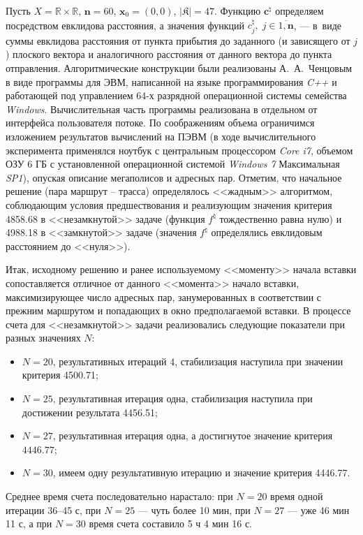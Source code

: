 Пусть
$X=\mathbb{R}\times\mathbb{R}$, $\mathbf{n}=60$,
$\mathbf{x}_0=(0,0)$,
$\vert \mathfrak{K} \vert=47$.
Функцию $\mathbf{c}^{\natural}$
определяем посредством евклидова расстояния,
а значения функций
$c_j^{\natural},\;j \in \overline{1,\mathbf{n}}$, ---
в~виде суммы евклидова расстояния от пункта прибытия до заданного
(и зависящего от $j$)
плоского вектора и аналогичного расстояния от данного
вектора до пункта отправления.
Алгоритмические конструкции были реализованы
А.~А.~Ченцовым в виде программы для ЭВМ,
написанной на языке программирования {\it C++}
и работающей под управлением 64-х разрядной операционной
системы семейства {\it Windows}.
Вычислительная часть программы реализована в отдельном от интерфейса пользователя потоке.
По соображениям объема ограничимся изложением результатов вычислений на ПЭВМ
(в ходе вычислительного эксперимента применялся ноутбук с центральным процессором
{\it Core i7}, объемом ОЗУ 6 ГБ
с установленной операционной системой
{\it Windows 7} Максимальная {\it SP1}),
опуская описание мегаполисов и адресных пар.
Отметим, что
начальное решение (пара маршрут -- трасса)
определялось <<жадным>> алгоритмом, соблюдающим условия предшествования
и реализующим значения критерия 4858.68 в <<незамкнутой>> задаче
(функция $f^{\natural}$ тождественно равна нулю)
и 4988.18 в <<замкнутой>> задаче
(значения $f^{\natural}$ определялись евклидовым расстоянием до <<нуля>>).

Итак, исходному решению и ранее используемому <<моменту>> начала
вставки сопоставляется отличное от данного <<момента>> начало вставки,
максимизирующее число адресных пар,
занумерованных в соответствии с прежним маршрутом и попадающих в
окно предполагаемой вставки.
В процессе счета для <<незамкнутой>> задачи
реализовались следующие показатели
при разных значениях $N$:

\begin{itemize}
  \item
  $N=20$, результативных итераций 4, стабилизация наступила при значении критерия 4500.71;
  \item
  $N=25$, результативная итерация одна, стабилизация наступила при достижении результата 4456.51;
  \item
  $N=27$, результативная итерация одна, а достигнутое значение критерия $4446.77$;
  \item
  $N=30$, имеем одну результативную итерацию и значение критерия 4446.77.
\end{itemize}

Среднее время счета последовательно нарастало:
при $N=20$ время одной итерации 36--45 с,
при $N=25$ --- чуть более 10 мин,
при $N=27$ --- уже 46 мин 11 с,
а при $N=30$ время счета составило 5 ч 4 мин 16 с.

